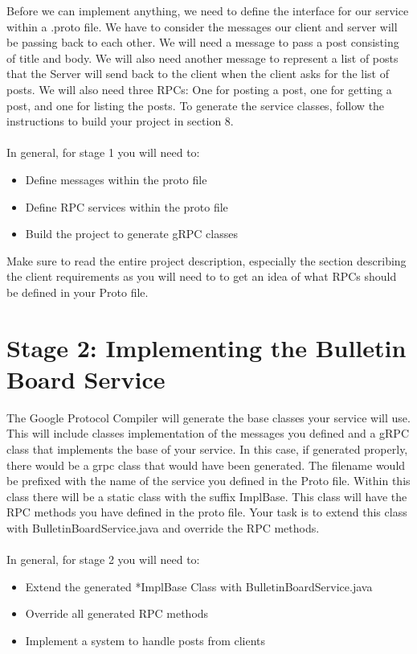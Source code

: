 \documentclass{article}
\newenvironment{info}[1][Info:]{ %
	\medskip
	\begin{mdframed}[style=info]
		\noindent{\textbf{#1}}
}{
	\end{mdframed}
}
\begin{document}
Before we can implement anything, we need to define the interface for our service within a .proto file. We have to consider the messages our client and server will be passing back to each other. We will need a message to pass a post consisting of title and body. We will also need another message to represent a list of posts that the Server will send back to the client when the client asks for the list of posts. We will also need three RPCs: One for posting a post, one for getting a post, and one for listing the posts. To generate the service classes, follow the instructions to build your project in section 8.\\\\In general, for stage 1 you will need to:
\begin{itemize}
\item Define messages within the proto file
\item Define RPC services within the proto file
\item Build the project to generate gRPC classes
\end{itemize}
\begin{info}[Note:]
Make sure to read the entire project description, especially the section describing the client requirements as you will need to to get an idea of what RPCs should be defined in your Proto file.
\end{info}



\section{Stage 2: Implementing the Bulletin Board Service} %

The Google Protocol Compiler will generate the base classes your service will use. This will include classes implementation of the messages you defined and a gRPC class that implements the base of your service. In this case, if generated properly, there would be a grpc class that would have been generated. The filename would be prefixed with the name of the service you defined in the Proto file. Within this class there will be a static class with the suffix ImplBase. This class will have the RPC methods you have defined in the proto file. Your task is to extend this class with BulletinBoardService.java and override the RPC methods. \\\\In general, for stage 2 you will need to:
\begin{itemize}
\item Extend the generated *ImplBase Class with BulletinBoardService.java
\item Override all generated RPC methods
\item Implement a system to handle posts from clients
\end{itemize}
\end{document}
